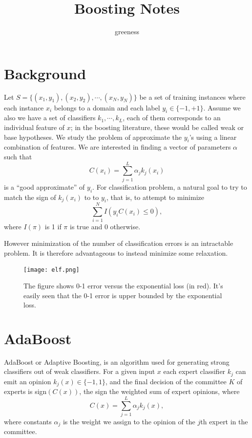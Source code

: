 \documentclass[]{article}  %
\begin{document}
\title{Boosting Notes}   %
\author{greeness}         %
\maketitle

\section{Background}
Let $S = \{(x_1,y_1), (x_2, y_2), \cdots, (x_N, y_N)\}$ be a set of training instances where each instance $x_i$ belongs to a domain and each label $y_i \in \{-1,+1\}$. Assume we also we have a set of classifiers $k_1, \cdots, k_L$, each of them corresponds to an individual feature of $x$; in the boosting literature, these would be called weak or base hypotheses.  We study the problem of approximate the $y_i$'s using a linear combination of features. We are interested in finding a vector of parameters $\alpha$ such that 
\[
C(x_i) = \sum_{j=1}^L \alpha_j k_j(x_i)
\]
is a ``good approximate'' of $y_i$. For classification problem, a natural goal to try to match the sign of $k_j(x_i)$ to to $y_i$, that is, to attempt to minimize
\[
\sum_{i=1}^N I (y_i C(x_i) \leq 0),
\] 
where $I(\pi)$ is 1 if $\pi$ is true and 0 otherwise. 

However minimization of the number of classification errors is an intractable problem. It is therefore advantageous to instead minimize some relaxation. 

\begin{figure}[h]
\begin{center}
\texttt{[image: elf.png]}\label{fig:elf}
\end{center}
\caption{The figure shows 0-1 error versus the exponential loss (in red). It's easily seen that the 0-1 error is upper bounded by the exponential loss.}
\end{figure}

\section{AdaBoost}
AdaBoost or Adaptive Boosting, is an algorithm used for generating strong classifiers out of weak classifiers. For a given input $x$ each expert classifier $k_j$ can emit an opinion $k_j(x)\in \{-1,1\}$, and the final decision of the committee $K$ of experts is sign$(C(x))$, the sign the weighted sum of expert opinions, where
\[
C(x) = \sum_{j=1}^L \alpha_j k_j (x),
\]
where constants $\alpha_j$ is the weight we assign to the opinion of the $j$th expert in the committee. 
\end{document}
